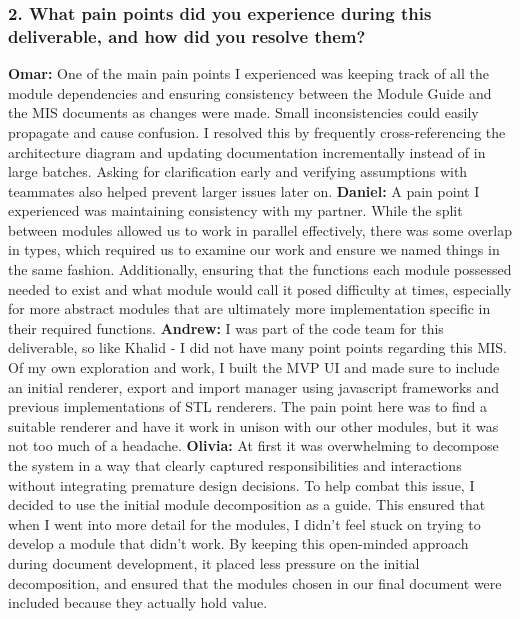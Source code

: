 \documentclass[12pt, titlepage]{article}
\begin{document}
\subsubsection*{2. What pain points did you experience during this deliverable, and how
did you resolve them?}
\bigskip
\textbf{Omar: } One of the main pain points I experienced was keeping track of all the module dependencies and ensuring consistency between the Module Guide and the MIS documents as changes were made. Small inconsistencies could easily propagate and cause confusion. I resolved this by frequently cross-referencing the architecture diagram and updating documentation incrementally instead of in large batches. Asking for clarification early and verifying assumptions with teammates also helped prevent larger issues later on.
\newline
\newline
\textbf{Daniel: } A pain point I experienced was maintaining consistency with my partner. While the split between modules allowed us to work in parallel effectively, there was some overlap in types, which required us to examine our work and ensure we named things in the same fashion. Additionally, ensuring that the functions each module possessed needed to exist and what module would call it posed difficulty at times, especially for more abstract modules that are ultimately more implementation specific in their required functions.
\newline
\newline
\textbf{Andrew: } I was part of the code team for this deliverable, so like Khalid - I did not have many point points regarding this MIS. Of my own exploration and work, I built the MVP UI and made sure to include an initial renderer, export and import manager using javascript frameworks and previous implementations of STL renderers. The pain point here was to find a suitable renderer and have it work in unison with our other modules, but it was not too much of a headache.
\newline
\newline
\textbf{Olivia: } At first it was overwhelming to decompose the system in a way that clearly captured responsibilities and interactions without integrating premature design decisions. To help combat this issue, I decided to use the initial module decomposition as a guide. This ensured that when I went into more detail for the modules, I didn’t feel stuck on trying to develop a module that didn’t work. By keeping this open-minded approach during document development, it placed less pressure on the initial decomposition, and ensured that the modules chosen in our final document were included because they actually hold value. 
\end{document}
